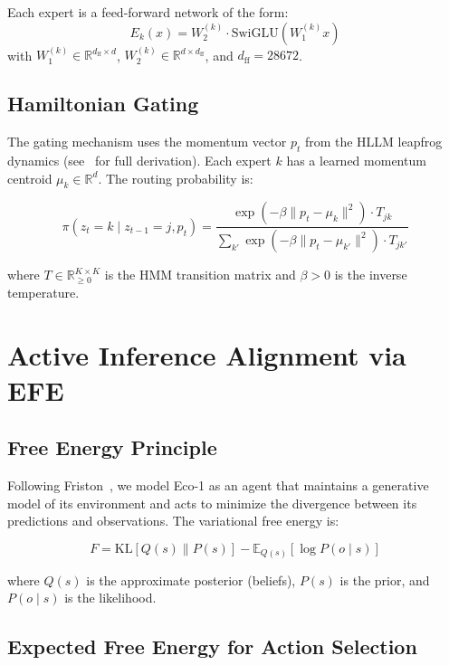 \documentclass[11pt,letterpaper]{article}
\newcommand{\R}{\mathbb{R}}
\newcommand{\E}{\mathbb{E}}
\newcommand{\KL}{\mathrm{KL}}
\begin{document}
Each expert is a feed-forward network of the form:
\begin{equation}
E_k(x) = W_2^{(k)} \cdot \text{SwiGLU}(W_1^{(k)} x)
\end{equation}
with $W_1^{(k)} \in \R^{d_{\text{ff}} \times d}$, $W_2^{(k)} \in \R^{d \times d_{\text{ff}}}$, and $d_{\text{ff}} = 28672$.

\subsection{Hamiltonian Gating}

The gating mechanism uses the momentum vector $p_t$ from the HLLM leapfrog dynamics (see~\cite{zoo_hllm} for full derivation). Each expert $k$ has a learned momentum centroid $\mu_k \in \R^d$. The routing probability is:

\begin{equation}
\pi(z_t = k \mid z_{t-1} = j, p_t) = \frac{\exp(-\beta \|p_t - \mu_k\|^2) \cdot T_{jk}}{\sum_{k'} \exp(-\beta \|p_t - \mu_{k'}\|^2) \cdot T_{jk'}}
\label{eq:gating}
\end{equation}

where $T \in \R^{K \times K}_{\geq 0}$ is the HMM transition matrix and $\beta > 0$ is the inverse temperature.

\section{Active Inference Alignment via EFE}
\label{sec:efe}

\subsection{Free Energy Principle}

Following Friston~\cite{friston2010free}, we model Eco-1 as an agent that maintains a generative model of its environment and acts to minimize the divergence between its predictions and observations. The variational free energy is:

\begin{equation}
F = \KL[Q(s) \| P(s)] - \E_{Q(s)}[\log P(o \mid s)]
\label{eq:free_energy}
\end{equation}

where $Q(s)$ is the approximate posterior (beliefs), $P(s)$ is the prior, and $P(o \mid s)$ is the likelihood.

\subsection{Expected Free Energy for Action Selection}
\end{document}
